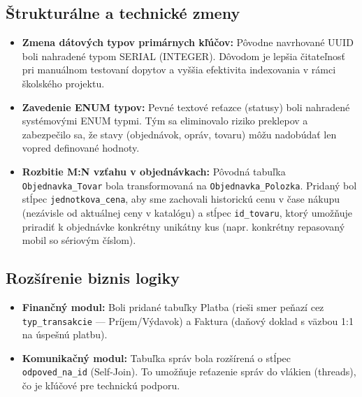 \documentclass[11pt, a4paper]{article}
\begin{document}

\subsection{Štrukturálne a technické zmeny}

\begin{itemize}
    \item \textbf{Zmena dátových typov primárnych kľúčov:} Pôvodne navrhované UUID boli nahradené typom SERIAL (INTEGER). Dôvodom je lepšia čitateľnosť pri manuálnom testovaní dopytov a vyššia efektivita indexovania v rámci školského projektu.
    \item \textbf{Zavedenie ENUM typov:} Pevné textové reťazce (statusy) boli nahradené systémovými ENUM typmi. Tým sa eliminovalo riziko preklepov a zabezpečilo sa, že stavy (objednávok, opráv, tovaru) môžu nadobúdať len vopred definované hodnoty.
    \item \textbf{Rozbitie M:N vzťahu v objednávkach:} Pôvodná tabuľka \texttt{Objednavka\_Tovar} bola transformovaná na \texttt{Objednavka\_Polozka}. Pridaný bol stĺpec \texttt{jednotkova\_cena}, aby sme zachovali historickú cenu v čase nákupu (nezávisle od aktuálnej ceny v katalógu) a stĺpec \texttt{id\_tovaru}, ktorý umožňuje priradiť k objednávke konkrétny unikátny kus (napr. konkrétny repasovaný mobil so sériovým číslom).
\end{itemize}


\subsection{Rozšírenie biznis logiky}

\begin{itemize}
    \item \textbf{Finančný modul:} Boli pridané tabuľky Platba (rieši smer peňazí cez \texttt{typ\_transakcie} — Príjem/Výdavok) a Faktura (daňový doklad s väzbou 1:1 na úspešnú platbu).
    \item \textbf{Komunikačný modul:} Tabuľka správ bola rozšírená o stĺpec \texttt{odpoved\_na\_id} (Self-Join). To umožňuje reťazenie správ do vlákien (threads), čo je kľúčové pre technickú podporu.
\end{itemize}
\end{document}
